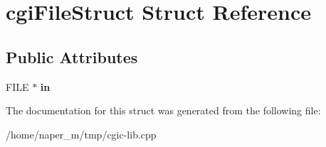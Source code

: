 \hypertarget{structcgi_file_struct}{\section{cgi\-File\-Struct Struct Reference}
\label{structcgi_file_struct}
}
\subsection*{Public Attributes}
\begin{DoxyCompactItemize}
\item 
\hypertarget{structcgi_file_struct_a94aa13782d6e4c0af64cb60439bc0ff3}{F\-I\-L\-E $\ast$ {\bfseries in}}\label{structcgi_file_struct_a94aa13782d6e4c0af64cb60439bc0ff3}

\end{DoxyCompactItemize}


The documentation for this struct was generated from the following file\-:\begin{DoxyCompactItemize}
\item 
/home/naper\-\_\-m/tmp/cgic-\/lib.\-cpp\end{DoxyCompactItemize}
